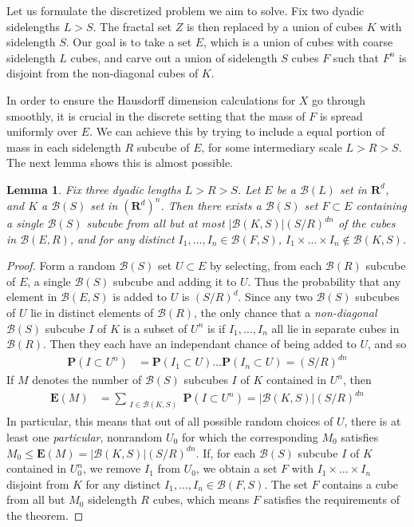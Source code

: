 \documentclass{article}
\theoremstyle{plain}
\newtheorem{lemma}{Lemma}
\theoremstyle{plain}
\begin{document}
Let us formulate the discretized problem we aim to solve. Fix two dyadic sidelengths $L > S$. The fractal set $Z$ is then replaced by a union of cubes $K$ with sidelength $S$. Our goal is to take a set $E$, which is a union of cubes with coarse sidelength $L$ cubes, and carve out a union of sidelength $S$ cubes $F$ such that $F^n$ is disjoint from the non-diagonal cubes of $K$.

In order to ensure the Hausdorff dimension calculations for $X$ go through smoothly, it is crucial in the discrete setting that the mass of $F$ is spread uniformly over $E$. We can achieve this by trying to include a equal portion of mass in each sidelength $R$ subcube of $E$, for some intermediary scale $L > R > S$. The next lemma shows this is almost possible.

\begin{lemma}
	Fix three dyadic lengths $L > R > S$. Let $E$ be a $\mathcal{B}(L)$ set in $\mathbf{R}^d$, and $K$ a $\mathcal{B}(S)$ set in $(\mathbf{R}^d)^n$. Then there exists a $\mathcal{B}(S)$ set $F \subset E$ containing a single $\mathcal{B}(S)$ subcube from all but at most $|\mathcal{B}(K,S)| (S/R)^{dn}$ of the cubes in $\mathcal{B}(E,R)$, and for any distinct $I_1, \dots, I_n \in \mathcal{B}(F,S)$, $I_1 \times \dots \times I_n \not \in \mathcal{B}(K,S)$.
\end{lemma}
\begin{proof}
	Form a random $\mathcal{B}(S)$ set $U \subset E$ by selecting, from each $\mathcal{B}(R)$ subcube of $E$, a single $\mathcal{B}(S)$ subcube and adding it to $U$. Thus the probability that any element in $\mathcal{B}(E,S)$ is added to $U$ is $(S/R)^d$. Since any two $\mathcal{B}(S)$ subcubes of $U$ lie in distinct elements of $\mathcal{B}(R)$, the only chance that a {\it non-diagonal} $\mathcal{B}(S)$ subcube $I$ of $K$ is a subset of $U^n$ is if $I_1, \dots, I_n$ all lie in separate cubes in $\mathcal{B}(R)$. Then they each have an independant chance of being added to $U$, and so
	\begin{align*}
		\mathbf{P}(I \subset U^n) &= \mathbf{P}(I_1 \subset U) \dots \mathbf{P}(I_n \subset U) = (S/R)^{dn}
	\end{align*}
	If $M$ denotes the number of $\mathcal{B}(S)$ subcubes $I$ of $K$ contained in $U^n$, then
	\begin{align*}
		\mathbf{E}(M) &= \sum_{\substack{I \in \mathcal{B}(K,S)}} \mathbf{P}(I \subset U^n) = |\mathcal{B}(K,S)| (S/R)^{dn}
	\end{align*}
	In particular, this means that out of all possible random choices of $U$, there is at least one {\it particular}, nonrandom $U_0$ for which the corresponding $M_0$ satisfies $M_0 \leq \mathbf{E}(M) = |\mathcal{B}(K,S)| (S/R)^{dn}$. If, for each $\mathcal{B}(S)$ subcube $I$ of $K$ contained in $U_0^n$, we remove $I_1$ from $U_0$, we obtain a set $F$ with $I_1 \times \dots \times I_n$ disjoint from $K$ for any distinct $I_1, \dots, I_n \in \mathcal{B}(F,S)$. The set $F$ contains a cube from all but $M_0$ sidelength $R$ cubes, which means $F$ satisfies the requirements of the theorem.
\end{proof}
\end{document}
